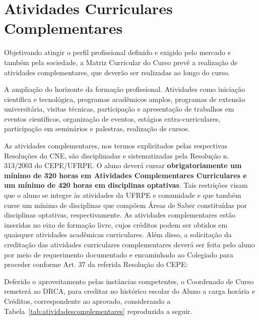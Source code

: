 \documentclass[
	12pt,				%
	openright,			%
  oneside,     %
	a4paper,			%
	english,			%
	french,				%
	spanish,			%
	brazil				%
	]{abntex2}
\begin{document}
\section{Atividades Curriculares Complementares}

Objetivando atingir o perfil profissional definido e exigido pelo mercado e
também pela sociedade, a Matriz Curricular do Curso prevê a realização de
atividades complementares, que deverão ser realizadas ao longo do curso. 

A ampliação do horizonte da formação profissional. Atividades como iniciação
científica e tecnológica, programas acadêmicos amplos, programas de extensão
universitária, visitas técnicas, participação e apresentação de trabalhos em
eventos científicos, organização de eventos, estágios extra-curriculares,
participação em seminários e palestras, realização de cursos.

As atividades complementares,  nos termos explicitados pelas respectivas
Resoluções do CNE, são disciplinadas  e sistematizadas pela Resolução n.
313/2003 do CEPE/UFRPE. O aluno deverá cursar  \textbf{obrigatoriamente um
mínimo de 320 horas em Atividades Complementares Curriculares e um mínimo de 420 horas em
disciplinas optativas}. Tais restrições visam que o aluno se integre  às atividades da UFRPE e comunidade e
que também curse um mínimo de disciplinas  que compõem Áreas de Saber
constituídas por disciplinas optativas,  respectivamente. As atividades
complementares estão inseridas no eixo de  formação livre, cujos créditos podem
ser obtidos em quaisquer atividades acadêmicas  curriculares. Além disso, a
solicitação da creditação das atividades curriculares  complementares deverá ser
feita pelo aluno por meio de requerimento documentado e  encaminhado ao
Colegiado para proceder conforme Art. 37 da referida  Resolução do CEPE:

Deferido o aproveitamento pelas instâncias competentes,  o Coordenado de Curso
remeterá ao DRCA, para creditar no histórico escolar do  Aluno a carga horária e
Créditos, correspondente ao aprovado, considerando a Tabela~\ref{tab:atividadescomplementares} reproduzida a seguir.
\end{document}
